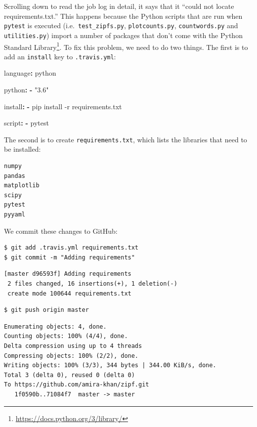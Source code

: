 \documentclass[
]{krantz}
\makeatletter
\newenvironment{Shaded}{\begin{snugshade}}{\end{snugshade}}
\newcommand{\AttributeTok}[1]{\textcolor[rgb]{0.77,0.63,0.00}{#1}}
\newcommand{\FunctionTok}[1]{\textcolor[rgb]{0.00,0.00,0.00}{#1}}
\newcommand{\KeywordTok}[1]{\textcolor[rgb]{0.13,0.29,0.53}{\textbf{#1}}}
\newcommand{\StringTok}[1]{\textcolor[rgb]{0.31,0.60,0.02}{#1}}
\renewcommand{\href}[2]{#2\footnote{\url{#1}}}
\newenvironment{kframe}{%
\medskip{}
\setlength{\fboxsep}{.8em}
 \def\at@end@of@kframe{}%
 \ifinner\ifhmode%
  \def\at@end@of@kframe{\end{minipage}}%
  \begin{minipage}{\columnwidth}%
 \fi\fi%
 \def\FrameCommand##1{\hskip\@totalleftmargin \hskip-\fboxsep
 \colorbox{shadecolor}{##1}\hskip-\fboxsep
     \hskip-\linewidth \hskip-\@totalleftmargin \hskip\columnwidth}%
 \MakeFramed {\advance\hsize-\width
   \@totalleftmargin\z@ \linewidth\hsize
   \@setminipage}}%
 {\par\unskip\endMakeFramed%
 \at@end@of@kframe}
\renewenvironment{Shaded}{\begin{kframe}}{\end{kframe}}
\makeatother
\begin{document}
Scrolling down to read the job log in detail,
it says that it ``could not locate requirements.txt.''
This happens because the Python scripts that are run when \texttt{pytest} is executed
(i.e.~\texttt{test\_zipfs.py}, \texttt{plotcounts.py}, \texttt{countwords.py} and \texttt{utilities.py})
import a number of packages that don't come with the
\href{https://docs.python.org/3/library/}{Python Standard Library}.
To fix this problem,
we need to do two things.
The first is to add an \texttt{install} key to \texttt{.travis.yml}:

\begin{Shaded}
\begin{Highlighting}[]
\FunctionTok{language}\KeywordTok{:}\AttributeTok{ python}

\FunctionTok{python}\KeywordTok{:}
\KeywordTok{{-}}\AttributeTok{ }\StringTok{"3.6"}

\FunctionTok{install}\KeywordTok{:}
\KeywordTok{{-}}\AttributeTok{ pip install {-}r requirements.txt}

\FunctionTok{script}\KeywordTok{:}
\KeywordTok{{-}}\AttributeTok{ pytest}
\end{Highlighting}
\end{Shaded}

The second is to create \texttt{requirements.txt},
which lists the libraries that need to be installed:

\begin{verbatim}
numpy
pandas
matplotlib
scipy
pytest
pyyaml
\end{verbatim}

We commit these changes to GitHub:

\begin{verbatim}
$ git add .travis.yml requirements.txt
$ git commit -m "Adding requirements"
\end{verbatim}

\begin{verbatim}
[master d96593f] Adding requirements
 2 files changed, 16 insertions(+), 1 deletion(-)
 create mode 100644 requirements.txt
\end{verbatim}

\begin{verbatim}
$ git push origin master
\end{verbatim}

\begin{verbatim}
Enumerating objects: 4, done.
Counting objects: 100% (4/4), done.
Delta compression using up to 4 threads
Compressing objects: 100% (2/2), done.
Writing objects: 100% (3/3), 344 bytes | 344.00 KiB/s, done.
Total 3 (delta 0), reused 0 (delta 0)
To https://github.com/amira-khan/zipf.git
   1f0590b..71084f7  master -> master
\end{verbatim}
\end{document}
